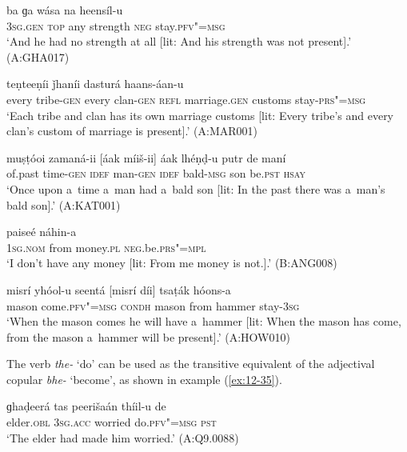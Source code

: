 \begin{exe}
\ex
\label{ex:12-30}
\gll [tasíi] ba ɡa wása na heensíl-u \\
\textsc{3sg.gen} \textsc{top} any strength \textsc{neg} stay.\textsc{pfv"=msg} \\
\glt `And he had no strength at all [lit: And his strength was not present].' (A:GHA017)
\end{exe}
\begin{exe}
\ex
\label{ex:12-31}
 teṇteeṇíi ǰhaníi dasturá haans-áan-u \\
every tribe-\textsc{gen} every clan-\textsc{gen} \textsc{refl} marriage.\textsc{gen}  customs stay-\textsc{prs"=msg}\\
\glt `Each tribe and clan has its own marriage customs [lit: Every tribe's and every clan's custom of marriage is present].' (A:MAR001)

\ex
\label{ex:12-32}
\gll muṣṭóoi zamaná-ii [áak míiš-ii] áak lhéṇḍ-u putr de maní \\
of.past time-\textsc{gen} \textsc{idef} man-\textsc{gen} \textsc{idef} bald-\textsc{msg} son be.\textsc{pst} \textsc{hsay} \\
\glt `Once upon a~time a~man had a~bald son [lit: In the past there was a~man's bald son].' (A:KAT001)
\end{exe}
\begin{exe}
\ex
\label{ex:12-33}
\gll [ma díi] paiseé náhin-a \\
\textsc{1sg.nom} from money.\textsc{pl} \textsc{neg}.be.\textsc{prs"=mpl} \\
\glt `I don't have any money [lit: From me money is not.].' (B:ANG008)
\end{exe}
\begin{exe}
\ex
\label{ex:12-34}
\gll misrí yhóol-u seentá [misrí díi] tsaṭák hóons-a \\
mason come.\textsc{pfv"=msg} \textsc{condh} mason from hammer stay-\textsc{3sg} \\
\glt `When the mason comes he will have a~hammer [lit: When the mason has come, from the mason a~hammer will be present].' (A:HOW010)
\end{exe}

 The verb \textit{the-} `do' can be used as the transitive equivalent of the adjectival copular \textit{bhe-} `become', as shown in example (\ref{ex:12-35}).

\begin{exe}
\ex
\label{ex:12-35}
\gll ɡhaḍeerá tas peerišaán thíil-u de \\
elder.\textsc{obl} \textsc{3sg.acc} worried do.\textsc{pfv"=msg} \textsc{pst} \\
\glt `The elder had made him worried.' (A:Q9.0088)
\end{exe}

